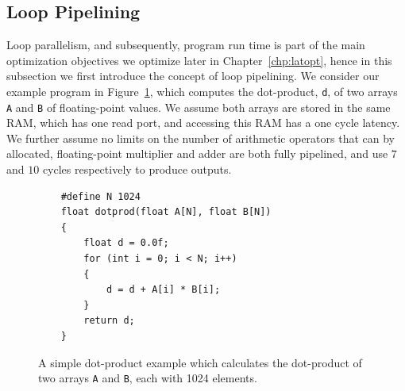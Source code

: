 \subsection{Loop Pipelining}
\label{bg:sub:loop_pipelining}

Loop parallelism, and subsequently, program run time is part of the main
optimization objectives we optimize later in Chapter~\ref{chp:latopt}, hence
in this subsection we first introduce the concept of loop pipelining.  We
consider our example program in Figure~\ref{bg:lst:dotprod}, which computes the
dot-product, \verb|d|, of two arrays \verb|A| and \verb|B| of floating-point
values.  We assume both arrays are stored in the same RAM, which has one read
port, and accessing this RAM has a one cycle latency.  We further assume
no limits on the number of arithmetic operators that can by allocated,
floating-point multiplier and adder are both fully pipelined, and use $7$ and
$10$ cycles respectively to produce outputs.
\begin{figure}[ht]
    \centering
    \begin{minipage}{0.7\textwidth}
    \begin{lstlisting}
    #define N 1024
    float dotprod(float A[N], float B[N])
    {
        float d = 0.0f;
        for (int i = 0; i < N; i++)
        {
            d = d + A[i] * B[i];
        }
        return d;
    }
    \end{lstlisting}
    \end{minipage}
    \caption{%
        A simple dot-product example which calculates the dot-product of two
        arrays \texttt{A} and \texttt{B}, each with 1024 elements.
    }\label{bg:lst:dotprod}
\end{figure}

